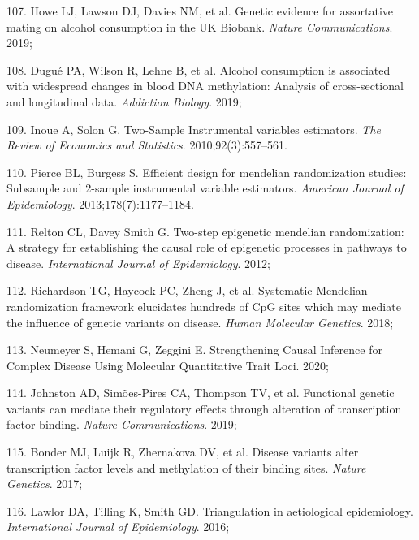 \documentclass[11pt,oneside]{bristolthesis}
\newenvironment{cslreferences}%
  {}%
  {\par}
\begin{document}
\begin{cslreferences}
\leavevmode\hypertarget{ref-Howe2019}{}%
107. Howe LJ, Lawson DJ, Davies NM, et al. Genetic evidence for assortative mating on alcohol consumption in the UK Biobank. \emph{Nature Communications}. 2019;

\leavevmode\hypertarget{ref-Dugue2019}{}%
108. Dugué PA, Wilson R, Lehne B, et al. Alcohol consumption is associated with widespread changes in blood DNA methylation: Analysis of cross-sectional and longitudinal data. \emph{Addiction Biology}. 2019;

\leavevmode\hypertarget{ref-Inoue2010}{}%
109. Inoue A, Solon G. Two-Sample Instrumental variables estimators. \emph{The Review of Economics and Statistics}. 2010;92(3):557--561.

\leavevmode\hypertarget{ref-Pierce2013}{}%
110. Pierce BL, Burgess S. Efficient design for mendelian randomization studies: Subsample and 2-sample instrumental variable estimators. \emph{American Journal of Epidemiology}. 2013;178(7):1177--1184.

\leavevmode\hypertarget{ref-Relton2012}{}%
111. Relton CL, Davey Smith G. Two-step epigenetic mendelian randomization: A strategy for establishing the causal role of epigenetic processes in pathways to disease. \emph{International Journal of Epidemiology}. 2012;

\leavevmode\hypertarget{ref-Richardson2018}{}%
112. Richardson TG, Haycock PC, Zheng J, et al. Systematic Mendelian randomization framework elucidates hundreds of CpG sites which may mediate the influence of genetic variants on disease. \emph{Human Molecular Genetics}. 2018;

\leavevmode\hypertarget{ref-Neumeyer2020}{}%
113. Neumeyer S, Hemani G, Zeggini E. Strengthening Causal Inference for Complex Disease Using Molecular Quantitative Trait Loci. 2020;

\leavevmode\hypertarget{ref-Johnston2019}{}%
114. Johnston AD, Simões-Pires CA, Thompson TV, et al. Functional genetic variants can mediate their regulatory effects through alteration of transcription factor binding. \emph{Nature Communications}. 2019;

\leavevmode\hypertarget{ref-Bonder2017}{}%
115. Bonder MJ, Luijk R, Zhernakova DV, et al. Disease variants alter transcription factor levels and methylation of their binding sites. \emph{Nature Genetics}. 2017;

\leavevmode\hypertarget{ref-Lawlor2016}{}%
116. Lawlor DA, Tilling K, Smith GD. Triangulation in aetiological epidemiology. \emph{International Journal of Epidemiology}. 2016;


\end{cslreferences}
\end{document}
